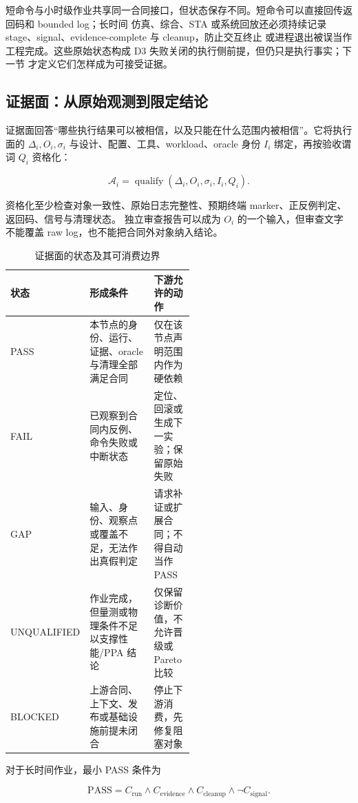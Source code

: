 \documentclass[UTF8,a4paper,zihao=-4,oneside]{ctexart}
\begin{document}
短命令与小时级作业共享同一合同接口，但状态保存不同。短命令可以直接回传返回码和 bounded log；长时间
仿真、综合、STA 或系统回放还必须持续记录 stage、signal、evidence-complete 与 cleanup，防止交互终止
或进程退出被误当作工程完成。这些原始状态构成 D3 失败关闭的执行侧前提，但仍只是执行事实；下一节
才定义它们怎样成为可接受证据。

\subsection{证据面：从原始观测到限定结论}

证据面回答“哪些执行结果可以被相信，以及只能在什么范围内被相信”。它将执行面的
$\Delta_i,O_i,\sigma_i$ 与设计、配置、工具、workload、oracle 身份 $I_i$ 绑定，再按验收谓词
$Q_i$ 资格化：

\[
\mathcal{A}_i=\operatorname{qualify}(\Delta_i,O_i,\sigma_i,I_i,Q_i).
\]

资格化至少检查对象一致性、原始日志完整性、预期终端 marker、正反例判定、返回码、信号与清理状态。
独立审查报告可以成为 $O_i$ 的一个输入，但审查文字不能覆盖 raw log，也不能把合同外对象纳入结论。

\begin{table}[htbp]
  \centering
  \small
  \caption{证据面的状态及其可消费边界}
  \label{tab:evidence-status-semantics}
  \begin{tabularx}{\linewidth}{@{}L{0.18\linewidth}L{0.35\linewidth}Y@{}}
    \toprule
    状态 & 形成条件 & 下游允许的动作 \\
    \midrule
    PASS & 本节点的身份、运行、证据、oracle 与清理全部满足合同 & 仅在该节点声明范围内作为硬依赖 \\
    FAIL & 已观察到合同内反例、命令失败或中断状态 & 定位、回滚或生成下一实验；保留原始失败 \\
    GAP & 输入、身份、观察点或覆盖不足，无法作出真假判定 & 请求补证或扩展合同；不得自动当作 PASS \\
    UNQUALIFIED & 作业完成，但量测或物理条件不足以支撑性能/PPA 结论 & 仅保留诊断价值，不允许晋级或 Pareto 比较 \\
    BLOCKED & 上游合同、上下文、发布或基础设施前提未闭合 & 停止下游消费，先修复阻塞对象 \\
    \bottomrule
  \end{tabularx}
\end{table}

对于长时间作业，最小 PASS 条件为

\[
\mathrm{PASS}=C_{\mathrm{run}}\land C_{\mathrm{evidence}}
\land C_{\mathrm{cleanup}}\land\neg C_{\mathrm{signal}}.
\]
\end{document}
